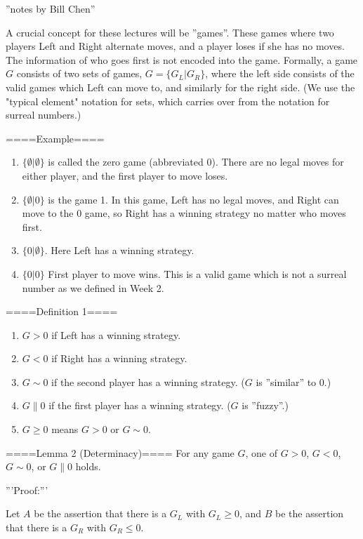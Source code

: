
''notes by Bill Chen''

A crucial concept for these lectures will be ''games''. These games where two players Left and Right alternate moves, and a player loses if she has no moves. The information of who goes first is not encoded into the game. Formally, a game $G$ consists of two sets of games, $G=\{G_L|G_R\}$, where the left side consists of the valid games which Left can move to, and similarly for the right side. (We use the "typical element" notation for sets, which carries over from the notation for surreal numbers.)

====Example====
\begin{enumerate}
  \item  $\{\emptyset|\emptyset\}$ is called the zero game (abbreviated 0). There are no legal moves for either player, and the first player to move loses.
  \item  $\{\emptyset|0\}$ is the game 1. In this game, Left has no legal moves, and Right can move to the 0 game, so Right has a winning strategy no matter who moves first.
  \item  $\{0|\emptyset\}$. Here Left has a winning strategy.
  \item  $\{0|0\}$ First player to move wins. This is a valid game which is not a surreal number as we defined in Week 2.
\end{enumerate}

====Definition 1====
\begin{enumerate}
  \item  $G>0$ if Left has a winning strategy.
  \item  $G<0$ if Right has a winning strategy.
  \item  $G\sim 0$ if the second player has a winning strategy. ($G$ is ''similar'' to $0$.)
  \item  $G\parallel 0$ if the first player has a winning strategy. ($G$ is ''fuzzy''.)
  \item  $G\ge 0$ means $G>0$ or $G\sim 0$.
\end{enumerate}

====Lemma 2 (Determinacy)====
For any game $G$, one of $G>0$, $G<0$, $G\sim 0$, or $G\parallel 0$ holds.

'''Proof:'''

Let $A$ be the assertion that there is a $G_L$ with $G_L\ge 0$, and $B$ be the assertion that there is a $G_R$ with $G_R\le 0$.

